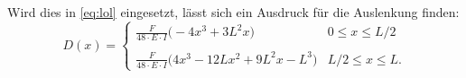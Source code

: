     Wird dies in \autoref{eq:lol} eingesetzt, lässt sich ein Ausdruck für die Auslenkung finden:
        \begin{equation}
            D(x) = 
            \begin{cases}
                \frac{F}{48 \cdot E \cdot I} \biggl(-4x^3 + 3L^2x\biggr) & 0 \leq x \leq L/2 \\
                \\
                \frac{F}{48 \cdot E \cdot I} \biggl(4x^3 - 12Lx^2 + 9L^2x - L^3\biggr) & L/2 \leq x \leq L.
            \end{cases}
            \label{eq:auslenkung}
        \end{equation}
    \newpage